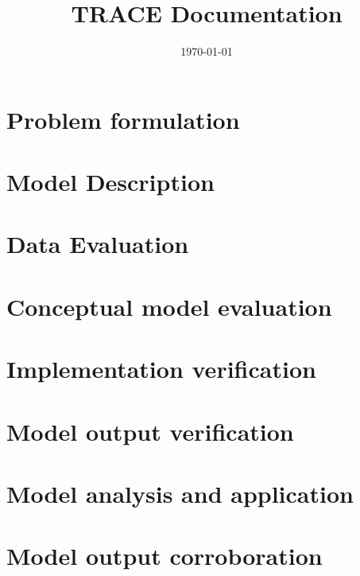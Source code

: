 \documentclass[a4paper, 11pt]{article}
\title{TRACE Documentation}
\author{}
\date{\today}
\begin{document}
\maketitle
\tableofcontents

\section{Problem formulation}

\section{Model Description}

\section{Data Evaluation}

\section{Conceptual model evaluation}

\section{Implementation verification}

\section{Model output verification}

\section{Model analysis and application}

\section{Model output corroboration}
\end{document}
